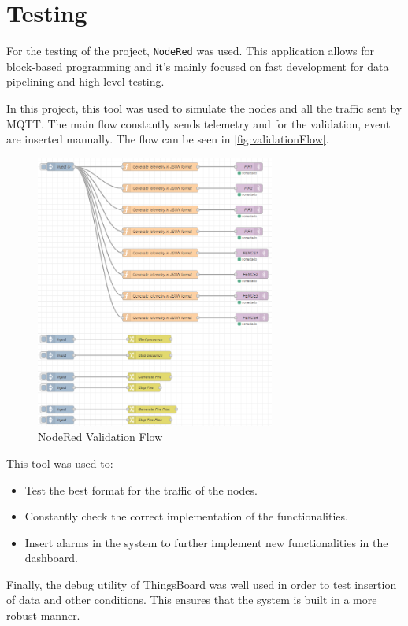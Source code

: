 \section{Testing}

For the testing of the project, \texttt{NodeRed}\cite{NodeRED} was used. This application 
allows for block-based programming and it's mainly focused on fast development for data pipelining and high level testing.

In this project, this tool was used to simulate the nodes and all the traffic sent by MQTT. The main flow constantly sends 
telemetry and for the validation, event are inserted manually. The flow can be seen in \autoref{fig:validationFlow}.
\begin{figure}[H]
    \centering
    \includegraphics[width=0.7\textwidth]{./images/9/NodeRed.png}
    \caption{NodeRed Validation Flow}
    \label{fig:validationFlow}
\end{figure}

This tool was used to:
\begin{itemize}
    \item Test the best format for the traffic of the nodes.
    \item Constantly check the correct implementation of the functionalities.
    \item Insert alarms in the system to further implement new functionalities in the dashboard.
\end{itemize}

Finally, the debug utility of ThingsBoard was well used in order to test insertion of data and other conditions. This ensures that the system is 
built in a more robust manner.

